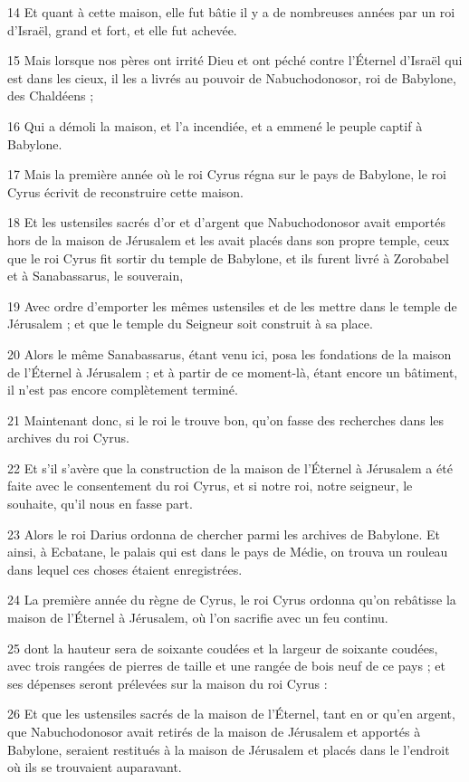 \par 14 Et quant à cette maison, elle fut bâtie il y a de nombreuses années par un roi d'Israël, grand et fort, et elle fut achevée.
\par 15 Mais lorsque nos pères ont irrité Dieu et ont péché contre l'Éternel d'Israël qui est dans les cieux, il les a livrés au pouvoir de Nabuchodonosor, roi de Babylone, des Chaldéens ;
\par 16 Qui a démoli la maison, et l'a incendiée, et a emmené le peuple captif à Babylone.
\par 17 Mais la première année où le roi Cyrus régna sur le pays de Babylone, le roi Cyrus écrivit de reconstruire cette maison.
\par 18 Et les ustensiles sacrés d'or et d'argent que Nabuchodonosor avait emportés hors de la maison de Jérusalem et les avait placés dans son propre temple, ceux que le roi Cyrus fit sortir du temple de Babylone, et ils furent livré à Zorobabel et à Sanabassarus, le souverain,
\par 19 Avec ordre d'emporter les mêmes ustensiles et de les mettre dans le temple de Jérusalem ; et que le temple du Seigneur soit construit à sa place.
\par 20 Alors le même Sanabassarus, étant venu ici, posa les fondations de la maison de l'Éternel à Jérusalem ; et à partir de ce moment-là, étant encore un bâtiment, il n'est pas encore complètement terminé.
\par 21 Maintenant donc, si le roi le trouve bon, qu'on fasse des recherches dans les archives du roi Cyrus.
\par 22 Et s'il s'avère que la construction de la maison de l'Éternel à Jérusalem a été faite avec le consentement du roi Cyrus, et si notre roi, notre seigneur, le souhaite, qu'il nous en fasse part.
\par 23 Alors le roi Darius ordonna de chercher parmi les archives de Babylone. Et ainsi, à Ecbatane, le palais qui est dans le pays de Médie, on trouva un rouleau dans lequel ces choses étaient enregistrées.
\par 24 La première année du règne de Cyrus, le roi Cyrus ordonna qu'on rebâtisse la maison de l'Éternel à Jérusalem, où l'on sacrifie avec un feu continu.
\par 25 dont la hauteur sera de soixante coudées et la largeur de soixante coudées, avec trois rangées de pierres de taille et une rangée de bois neuf de ce pays ; et ses dépenses seront prélevées sur la maison du roi Cyrus :
\par 26 Et que les ustensiles sacrés de la maison de l'Éternel, tant en or qu'en argent, que Nabuchodonosor avait retirés de la maison de Jérusalem et apportés à Babylone, seraient restitués à la maison de Jérusalem et placés dans le l'endroit où ils se trouvaient auparavant.
